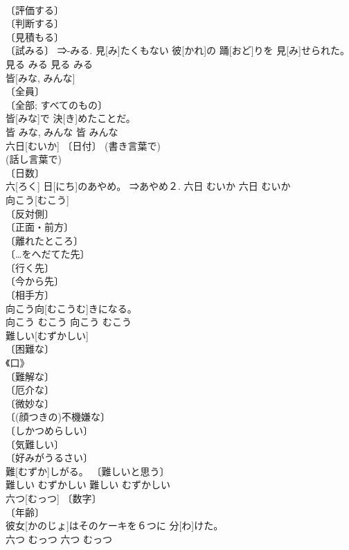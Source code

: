 \documentclass[8pt]{extreport}
\begin{document}
\begin{CJK}{UTF8}{min}
\\	〔評価する〕 
\\	〔判断する〕 
\\	〔見積もる〕 
\\	〔試みる〕 ⇒-みる.	見[み]たくもない 彼[かれ]の 踊[おど]りを 見[み]せられた。	
\\	見る	みる	見る	みる	
\\	皆[みな, みんな]	
\\	〔全員〕 
\\	〔全部; すべてのもの〕 
\\	皆[みな]で 決[き]めたことだ。	
\\	皆	みな, みんな	皆	みんな	
\\	六日[むいか]	〔日付〕 (書き言葉で) 
\\	(話し言葉で) 
\\	〔日数〕 
\\	六[ろく] 日[にち]のあやめ。	⇒あやめ２.	六日	むいか	六日	むいか	
\\	向こう[むこう]	
\\	〔反対側〕 
\\	〔正面・前方〕 
\\	〔離れたところ〕 
\\	〔…をへだてた先〕 
\\	〔行く先〕 
\\	〔今から先〕 
\\	〔相手方〕 
\\	向こう向[むこうむ]きになる。	
\\	向こう	むこう	向こう	むこう	
\\	難しい[むずかしい]	
\\	〔困難な〕 
\\	《口》 
\\	〔難解な〕 
\\	〔厄介な〕 
\\	〔微妙な〕 
\\	〔(顔つきの)不機嫌な〕 
\\	〔しかつめらしい〕 
\\	〔気難しい〕 
\\	〔好みがうるさい〕 
\\	難[むずか]しがる。	〔難しいと思う〕 
\\	難しい	むずかしい	難しい	むずかしい	
\\	六つ[むっつ]	〔数字〕 
\\	〔年齢〕 
\\	彼女[かのじょ]はそのケーキを６つに 分[わ]けた。	
\\	六つ	むっつ	六つ	むっつ	

\end{CJK}
\end{document}
